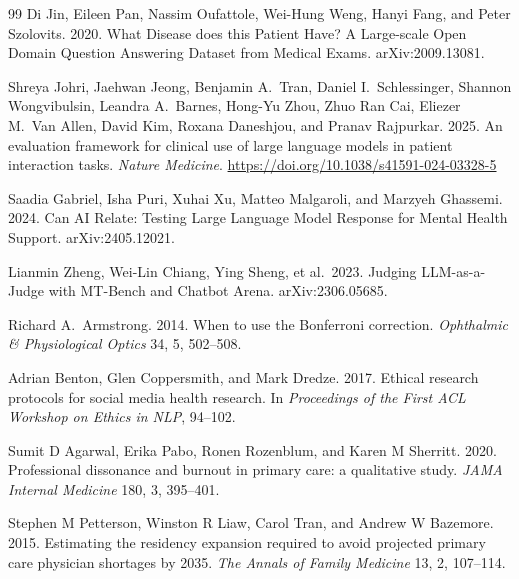 \documentclass[12pt, a4paper]{article}
\begin{document}
\begin{thebibliography}{99}
Di Jin, Eileen Pan, Nassim Oufattole, Wei-Hung Weng, Hanyi Fang, and Peter Szolovits. 2020.
\newblock What Disease does this Patient Have? A Large-scale Open Domain Question Answering Dataset from Medical Exams.
\newblock arXiv:2009.13081.

Shreya Johri, Jaehwan Jeong, Benjamin A.\ Tran, Daniel I.\ Schlessinger, Shannon Wongvibulsin, Leandra A.\ Barnes, Hong-Yu Zhou, Zhuo Ran Cai, Eliezer M.\ Van Allen, David Kim, Roxana Daneshjou, and Pranav Rajpurkar. 2025.
\newblock An evaluation framework for clinical use of large language models in patient interaction tasks.
\newblock \textit{Nature Medicine}. \url{https://doi.org/10.1038/s41591-024-03328-5}

Saadia Gabriel, Isha Puri, Xuhai Xu, Matteo Malgaroli, and Marzyeh Ghassemi. 2024.
\newblock Can AI Relate: Testing Large Language Model Response for Mental Health Support.
\newblock arXiv:2405.12021.

Lianmin Zheng, Wei-Lin Chiang, Ying Sheng, et al.\ 2023.
\newblock Judging LLM-as-a-Judge with MT-Bench and Chatbot Arena.
\newblock arXiv:2306.05685.

Richard A.\ Armstrong. 2014.
\newblock When to use the Bonferroni correction.
\newblock \textit{Ophthalmic \& Physiological Optics} 34, 5, 502--508.

Adrian Benton, Glen Coppersmith, and Mark Dredze. 2017.
\newblock Ethical research protocols for social media health research.
\newblock In \textit{Proceedings of the First ACL Workshop on Ethics in NLP}, 94--102.

Sumit D Agarwal, Erika Pabo, Ronen Rozenblum, and Karen M Sherritt. 2020.
\newblock Professional dissonance and burnout in primary care: a qualitative study.
\newblock \textit{JAMA Internal Medicine} 180, 3, 395--401.

Stephen M Petterson, Winston R Liaw, Carol Tran, and Andrew W Bazemore. 2015.
\newblock Estimating the residency expansion required to avoid projected primary care physician shortages by 2035.
\newblock \textit{The Annals of Family Medicine} 13, 2, 107--114.

\end{thebibliography}
\end{document}

